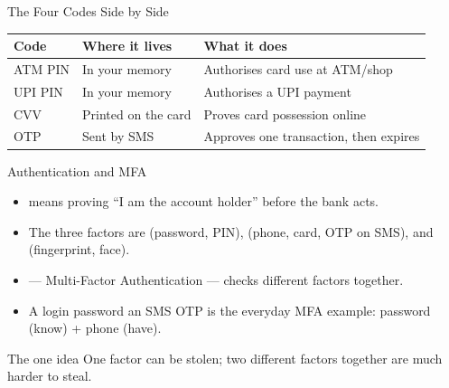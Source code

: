 \documentclass[aspectratio=169]{beamer}
\begin{document}
\begin{frame}{The Four Codes Side by Side}
  \begin{center}
    \begin{tabular}{lll}
      \toprule
      \textbf{Code} & \textbf{Where it lives} & \textbf{What it does} \\
      \midrule
      ATM PIN & In your memory & Authorises card use at ATM/shop \\
      UPI PIN & In your memory & Authorises a UPI payment \\
      CVV & Printed on the card & Proves card possession online \\
      OTP & Sent by SMS & Approves one transaction, then expires \\
      \bottomrule
    \end{tabular}
  \end{center}
  \vspace{0.25cm}
\end{frame}

\begin{frame}{Authentication and MFA}
  \begin{itemize}
    \item {} means proving ``I am the account holder''
      before the bank acts.
    \item The three factors are  (password, PIN),
       (phone, card, OTP on SMS), and
       (fingerprint, face).
    \item {} --- Multi-Factor Authentication --- checks
       different factors together.
    \item A login password  an SMS OTP is the everyday MFA
      example: password (know) + phone (have).
  \end{itemize}
  \begin{block}{The one idea}
    One factor can be stolen; two different factors together are much harder
    to steal.
  \end{block}
\end{frame}
\end{document}
